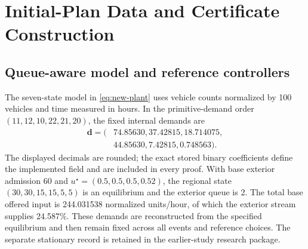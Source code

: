 \documentclass[journal,10pt]{IEEEtran}
\begin{document}
\FloatBarrier


\appendices
{}
\section{Initial-Plan Data and Certificate Construction}
\label{app:new-model}

\subsection{Queue-aware model and reference controllers}

The seven-state model in \eqref{eq:new-plant} uses vehicle counts normalized
by 100 vehicles and time measured in hours. In the primitive-demand order
$(11,12,10,22,21,20)$, the fixed internal demands are
\begin{equation}
\begin{aligned}
\boldsymbol d=(&74.85630,37.42815,18.714075,\\
              &44.85630,7.42815,0.748563).
\end{aligned}
\label{eq:new-incident-demands}
\end{equation}
The displayed decimals are rounded; the exact stored binary coefficients
define the implemented field and are included in every proof. With base
exterior admission 60 and $u^\star=(0.5,0.5,0.5,0.52)$, the regional
state $(30,30,15,15,5,5)$ is an equilibrium and the exterior queue is 2.
The total base offered input is 244.031538 normalized units/hour, of which
the exterior stream supplies 24.587\%. These demands are reconstructed from
the specified equilibrium and then remain fixed across all events and
reference choices. The separate stationary record is retained in the earlier-study research package.
\end{document}
